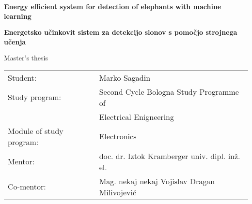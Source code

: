 \begin{center}

    \vspace*{4.0cm}
    \fontsize{26}{26}
    \selectfont
    \textbf{Energy efficient system for detection of elephants with machine learning}

    \vspace{1.0cm}

    \fontsize{26}{26}
    \selectfont
    \textbf{Energetsko učinkovit sistem za detekcijo slonov s pomočjo strojnega učenja}

    \vspace{0.5cm}

    \fontsize{16}{18}
    \selectfont
    Master's thesis

\end{center}

\vspace*{\fill}

\begin{tabular}{ l l }
    Student: & Marko Sagadin  \\ 
    Study program: & Second Cycle Bologna Study Programme of\\  
                   & Electrical Enigneering \\
    Module of study program: & Electronics \\
    Mentor: & doc. dr. Iztok Kramberger univ. dipl. inž. el. \\
    Co-mentor: & Mag. nekaj nekaj Vojislav Dragan Milivojević \\
\end{tabular}

\newpage
